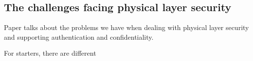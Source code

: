 \documentclass[conference]{IEEEtran}
\begin{document}
\subsection{The challenges facing physical layer security}
Paper \cite{7120011} talks about the problems we have when dealing with physical layer security and supporting authentication and confidentiality. 

For starters, there are different 

\newpage


\end{document}
